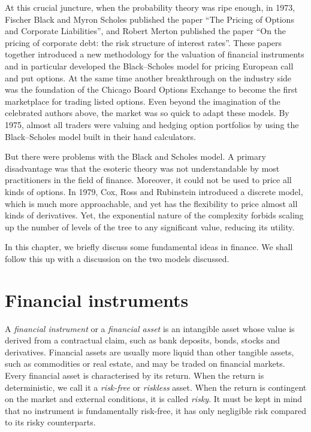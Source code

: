 At this crucial juncture, when the probability theory was ripe enough, in 1973, Fischer Black and Myron Scholes published the paper “The Pricing of Options and Corporate Liabilities”, and Robert Merton published the paper “On the pricing of corporate debt: the risk structure of interest rates”. These papers together introduced a new methodology for the valuation of financial instruments and in particular developed the Black–Scholes model for pricing European call and put options. At the same time another breakthrough on the industry side was the foundation of the Chicago Board Options Exchange to become the first marketplace for trading listed options. Even beyond the imagination of the celebrated authors above, the market was so quick to adapt these models. By 1975, almost all traders were valuing and hedging option portfolios by using the Black–Scholes model built in their hand calculators.

But there were problems with the Black and Scholes model. A primary disadvantage was that the esoteric theory was not understandable by most practitioners in the field of finance. Moreover, it could not be used to price all kinds of options. In 1979, Cox, Ross and Rubinstein introduced a discrete model, which is much more approachable, and yet has the flexibility to price almost all kinds of derivatives. Yet, the exponential nature of the complexity forbids scaling up the number of levels of the tree to any significant value, reducing its utility.

In this chapter, we briefly discuss some fundamental ideas in finance. We shall follow this up with a discussion on the two models discussed.


\section{Financial instruments}
\label{sec:intro-assets}

A \emph{financial instrument} or a \emph{financial asset} is an intangible asset whose value is derived from a contractual claim, such as bank deposits, bonds, stocks and derivatives. Financial assets are usually more liquid than other tangible assets, such as commodities or real estate, and may be traded on financial markets. Every financial asset is characterised by its return. When the return is deterministic, we call it a \emph{risk-free} or \emph{riskless} asset. When the return is contingent on the market and external conditions, it is called \emph{risky}. It must be kept in mind that no instrument is fundamentally risk-free, it has only negligible risk compared to its risky counterparts.



